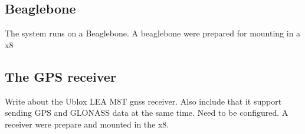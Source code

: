 \subsection{Beaglebone}
The system runs on a Beaglebone. A beaglebone were prepared for mounting in a x8
\subsection{The GPS receiver}
Write about the Ublox LEA M8T gnss receiver. Also include that it support sending GPS and GLONASS data at the same time. Need to be configured. A receiver were prepare and mounted in the x8.
\cleardoublepage